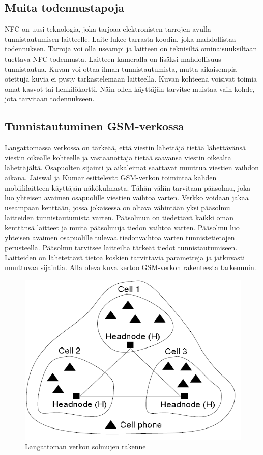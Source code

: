\documentclass[finnish]{tktltiki2}
\theoremstyle{definition}
\theoremstyle{remark}
\begin{document}
\subsection{Muita todennustapoja}

NFC on uusi teknologia, joka tarjoaa elektronisten tarrojen avulla tunnistautumisen laitteelle. Laite lukee tarrasta koodin, joka mahdollistaa todennuksen. Tarroja voi olla useampi ja laitteen on teknisiltä ominaisuuksiltaan tuettava NFC-todennusta. Laitteen kameralla on lisäksi mahdollisuus tunnistautua. Kuvan voi ottaa ilman tunnistautumista, mutta aikaisempia otettuja kuvia ei pysty tarkastelemaan laitteella. Kuvan kohteena voisivat toimia omat kasvot tai henkilökortti. Näin ollen käyttäjän tarvitse muistaa vain kohde, jota tarvitaan todennukseen.

\subsection{Tunnistautuminen GSM-verkossa}

Langattomassa verkossa on tärkeää, että viestin lähettäjä tietää lähettävänsä viestin oikealle kohteelle ja vastaanottaja tietää saavansa viestin oikealta lähettäjältä. Osapuolten sijainti ja aikaleimat saattavat muuttua viestien vaihdon aikana. Jaiswal ja Kumar \cite{cell} esittelevät GSM-verkon toimintaa kahden mobiililaitteen käyttäjän näkökulmasta. Tähän väliin tarvitaan pääsolmu, joka luo yhteisen avaimen osapuolille viestien vaihtoa varten. Verkko voidaan jakaa useampaan kenttään, jossa jokaisessa on oltava vähintään yksi pääsolmu laitteiden tunnistautumista varten. Pääsolmun on tiedettävä kaikki oman kenttänsä laitteet ja muita pääsolmuja tiedon vaihtoa varten. Pääsolmu luo yhteisen avaimen osapuolille tulevaa tiedonvaihtoa varten tunnistetietojen perusteella. Pääsolmu tarvitsee laitteilta tärkeät tiedot tunnistautumiseen. Laitteiden on lähetettävä tietoa koskien tarvittavia parametreja ja jatkuvasti muuttuvaa sijaintia. Alla oleva kuva kertoo GSM-verkon rakenteesta tarkemmin.

\begin{figure}[h!]
\centering
	\includegraphics[scale=0.6]{nodes}
\caption{Langattoman verkon solmujen rakenne \cite{cell}}
\end{figure}	
\end{document}
